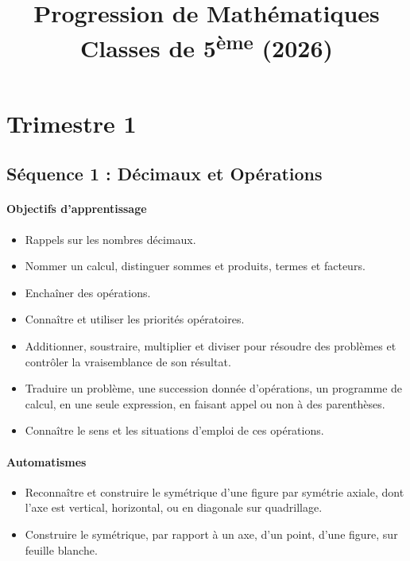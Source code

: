 \documentclass[11pt,a4paper]{article}
\title{\textbf{Progression de Mathématiques \\ Classes de 5\textsuperscript{ème} (2026)}}
\author{}
\date{}
\begin{document}
\maketitle

\section*{Trimestre 1}

\subsection*{Séquence 1 : Décimaux et Opérations}

\paragraph{Objectifs d'apprentissage}
\begin{itemize}[label=\bullet]
    \item Rappels sur les nombres décimaux.
    \item Nommer un calcul, distinguer sommes et produits, termes et facteurs.
    \item Enchaîner des opérations.
    \item Connaître et utiliser les priorités opératoires.
    \item Additionner, soustraire, multiplier et diviser pour résoudre des problèmes et contrôler la vraisemblance de son résultat.
    \item Traduire un problème, une succession donnée d'opérations, un programme de calcul, en une seule expression, en faisant appel ou non à des parenthèses.
    \item Connaître le sens et les situations d'emploi de ces opérations.
\end{itemize}

\paragraph{Automatismes}
\begin{itemize}[label=\bullet]
    \item Reconnaître et construire le symétrique d'une figure par symétrie axiale, dont l'axe est vertical, horizontal, ou en diagonale sur quadrillage.
    \item Construire le symétrique, par rapport à un axe, d'un point, d'une figure, sur feuille blanche.
\end{itemize}
\end{document}
